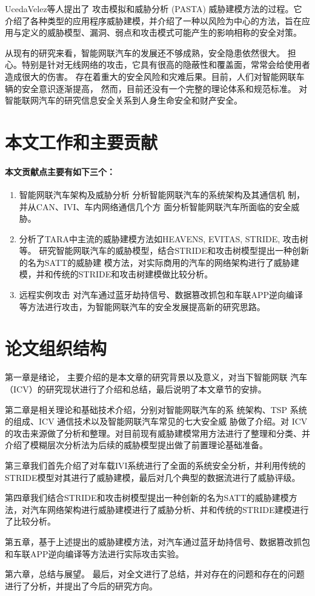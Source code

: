 UcedaVelez等人提出了\cite{ucedavelez2015risk} 攻击模拟和威胁分析 (PASTA) 威胁建模方法的过程。它介绍了各种类型的应用程序威胁建模，并介绍了一种以风险为中心的方法，旨在应用与定义的威胁模型、漏洞、弱点和攻击模式可能产生的影响相称的安全对策。 

从现有的研究来看，智能网联汽车的发展还不够成熟，安全隐患依然很大。
担心。特别是针对无线网络的攻击，它具有很高的隐蔽性和覆盖面，常常会给使用者造成很大的伤害。
存在着重大的安全风险和灾难后果。目前，人们对智能网联车辆的安全意识逐渐提高，
然而，目前还没有一个完整的理论体系和规范标准。
对智能联网汽车的研究信息安全关系到人身生命安全和财产安全。

\section{本文工作和主要贡献}
\paragraph{本文贡献点主要有如下三个：}

\begin{enumerate}
    \item 智能网联汽车架构及威胁分析 
    分析智能网联汽车的系统架构及其通信机
    制，并从CAN、IVI、车内网络通信几个方
    面分析智能网联汽车所面临的安全威胁。
    \item 分析了TARA中主流的威胁建模方法如HEAVENS, EVITAS, STRIDE, 攻击树等。
    研究智能网联汽车的威胁模型，结合STRIDE和攻击树模型提出一种创新的名为SATT的威胁建
模方法，对实际商用的汽车的网络架构进行了威胁建模，并和传统的STRIDE和攻击树建模做比较分析。
    \item 远程实例攻击
    对汽车通过蓝牙劫持信号、数据篡改抓包和车联APP逆向编译等方法进行攻击，为智能网联汽车的安全发展提高新的研究思路。
\end{enumerate}


\section{论文组织结构}
第一章是绪论， 主要介绍的是本文章的研究背景以及意义，对当下智能网联
汽车（ICV）的研究现状进行了介绍和总结，最后说明了本文章节的安排。

第二章是相关理论和基础技术介绍，分别对智能网联汽车的系
统架构、TSP 系统的组成、ICV 通信技术以及智能网联汽车常见的七大安全威
胁做了介绍。对 ICV 的攻击来源做了分析和整理。对目前现有威胁建模常用方法进行了整理和分类、并介绍了模糊层次分析法为后续的威胁模型提出做了前置理论基础准备。

第三章我们首先介绍了对车载IVI系统进行了全面的系统安全分析，并利用传统的STRIDE模型对其进行了威胁建模，最后对几个典型的数据流进行了威胁评级。

第四章我们结合STRIDE和攻击树模型提出一种创新的名为SATT的威胁建模方法，对汽车网络架构进行威胁建模进行了威胁分析、并和传统的STRIDE建模进行了比较分析。

第五章，基于上述提出的威胁建模方法，对汽车通过蓝牙劫持信号、数据篡改抓包和车联APP逆向编译等方法进行实际攻击实验。

第六章，总结与展望。
最后，对全文进行了总结，并对存在的问题和存在的问题进行了分析，并提出了今后的研究方向。
